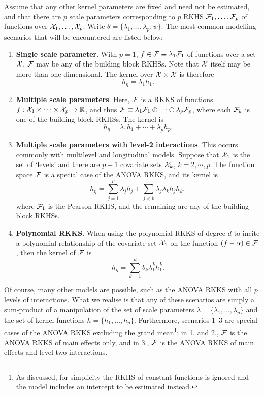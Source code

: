 Assume that any other kernel parameters are fixed and need not be estimated, and that there are $p$ scale parameters corresponding to $p$ RKHS ${\mathcal F}_1,\dots,{\mathcal F}_p$ of functions over ${\mathcal X}_1,\dots,{\mathcal X}_p$.
Write $\theta = \{\lambda_1,\dots,\lambda_p,\psi\}$.
The most common modelling scenarios that will be encountered are listed below:
\begin{enumerate}
  \item \textbf{Single scale parameter}. With $p=1$, $f\in{\mathcal F}\equiv \lambda_1{\mathcal F}_1$ of functions over a set ${\mathcal X}$. ${\mathcal F}$ may be any of the building block RKHSs. Note that ${\mathcal X}$ itself may be more than one-dimensional. The kernel over ${\mathcal X}\times{\mathcal X}$ is therefore
  \[
    h_\eta = \lambda_1 h_1.
  \]
  \item \textbf{Multiple scale parameters}. Here, ${\mathcal F}$ is a RKKS of functions $f:{\mathcal X}_1\times\cdots\times{\mathcal X}_p\to\mathbb{R}$, and thus ${\mathcal F}\equiv \lambda_1{\mathcal F}_1 \oplus \cdots \oplus \lambda_p{\mathcal F}_p$, where each ${\mathcal F}_k$ is one of the building block RKHSs. The kernel is
  \[
    h_\eta = \lambda_1 h_1 + \cdots + \lambda_p h_p.
  \]
  \item \textbf{Multiple scale parameters with level-2 interactions}. This occurs commonly with multilevel and longitudinal models. Suppose that ${\mathcal X}_1$ is the set of `levels' and there are $p-1$ covariate sets ${\mathcal X}_k$, $k=2,\cdots,p$. The function space ${\mathcal F}$ is a special case of the ANOVA RKKS, and its kernel is
  \[
    h_\eta = \sum_{j=1}^p \lambda_j h_j + \sum_{j < k} \lambda_j\lambda_k h_j h_k,
  \]
  where ${\mathcal F}_1$ is the Pearson RKHS, and the remaining are any of the building block RKHSs.
  \item \textbf{Polynomial RKKS}. When using the polynomial RKKS of degree $d$ to incite a polynomial relationship of the covariate set ${\mathcal X}_1$ on the function $(f-\alpha)\in{\mathcal F}$, then the kernel of ${\mathcal F}$ is
  \[
    h_\eta = \sum_{k=1}^d b_k \lambda_1^k h_1^k.
  \]
\end{enumerate}
Of course, many other models are possible, such as the ANOVA RKKS with all $p$ levels of interactions.
What we realise is that any of these scenarios are simply a sum-product of a manipulation of the set of scale parameters $\lambda = \{\lambda_1,\dots,\lambda_p\}$ and the set of kernel functions $h = \{h_1,\dots,h_p\}$.
Furthermore, scenarios 1--3 are special cases of the ANOVA RKKS excluding the grand mean\footnote{As discussed, for simplicity the RKHS of constant functions is ignored and the model includes an intercept to be estimated instead.}: in 1. and 2., ${\mathcal F}$ is the ANOVA RKKS of main effects only, and in 3., ${\mathcal F}$ is the ANOVA RKKS of main effects and level-two interactions.

